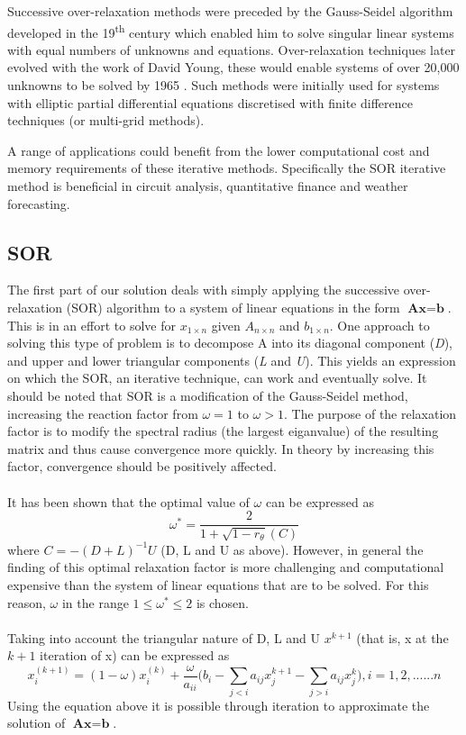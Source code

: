 \documentclass[paper=a4, fontsize=10pt]{scrartcl} %
\begin{document}
Successive over-relaxation methods were preceded by the Gauss-Seidel algorithm developed in the 19\textsuperscript{th} century which enabled him to solve singular linear systems with equal numbers of unknowns and equations. Over-relaxation techniques later evolved with the work of David Young, these would enable systems of over 20,000 unknowns to be solved by 1965 \cite{saad2000iterative}. Such methods were initially used for systems with elliptic partial differential equations discretised with finite difference techniques (or multi-grid methods). 

A range of applications could benefit from the lower computational cost and memory requirements of these iterative methods. Specifically the SOR iterative method is beneficial in circuit analysis, quantitative finance and weather forecasting.
\subsection {SOR}
{The first part of our solution  deals with simply applying the successive over-relaxation (SOR) algorithm to a system of linear equations in the form $\textbf{A}\textbf{x} = \textbf{b}$. This is in an effort to solve for $x_{1\times n}$ given $A_{n\times n}$ and $b_{1\times n}$. One approach to solving this type of problem is to decompose A into its diagonal component ({\it D}), and upper and lower triangular components ({\it L} and {\it U}). This yields an expression on which the SOR, an iterative technique, can work and eventually solve. It should be noted that SOR is a modification of the Gauss-Seidel method, increasing the reaction factor from $\omega = 1$ to $\omega > 1$. The purpose of the relaxation factor is to modify the spectral radius (the largest eiganvalue) of the resulting matrix and thus cause convergence more quickly. In theory by increasing this factor, convergence should be positively affected. \\\\
It has been shown that the optimal value of $\omega$ can be expressed as
\begin {equation}
\omega^* = \frac{2}{1 + \sqrt{1 - r_\theta}(C)}
\end {equation}
where $C = -(D + L)^{-1}U$ (D, L and U as above). However, in general the finding of this optimal relaxation factor is more challenging and computational expensive than the system of linear equations that are to be solved. For this reason, $\omega$ in the range $1 \leq \omega^* \leq 2$ is chosen.\\\\
Taking into account the triangular nature of D, L and U $x^{k+1}$ (that is, x at the $k+1$ iteration of x) can be expressed as
\begin{equation}
x_{i}^{(k+1)} = (1 - \omega)x_{i}^{(k)} + \frac {\omega}{a_{ii}}\bigg( b_i - \sum\limits_{j<i} a_{ij} x_j^{k+1} - \sum\limits_{j>i} a_{ij}  x_j^{k} \bigg) , i = 1,2,......n
\end{equation}
Using the equation above it is possible through iteration to approximate the solution of $\textbf{A}\textbf{x} = \textbf{b}$.}
\end{document}
